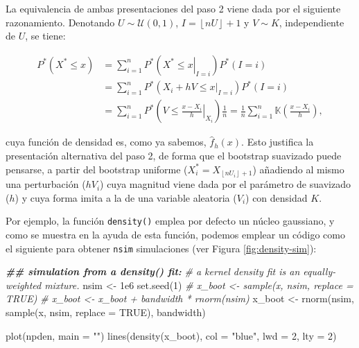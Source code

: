 \documentclass[
]{book}
\newenvironment{Shaded}{\begin{snugshade}}{\end{snugshade}}
\newcommand{\AttributeTok}[1]{\textcolor[rgb]{0.77,0.63,0.00}{#1}}
\newcommand{\CommentTok}[1]{\textcolor[rgb]{0.56,0.35,0.01}{\textit{#1}}}
\newcommand{\ConstantTok}[1]{\textcolor[rgb]{0.00,0.00,0.00}{#1}}
\newcommand{\DecValTok}[1]{\textcolor[rgb]{0.00,0.00,0.81}{#1}}
\newcommand{\DocumentationTok}[1]{\textcolor[rgb]{0.56,0.35,0.01}{\textbf{\textit{#1}}}}
\newcommand{\FloatTok}[1]{\textcolor[rgb]{0.00,0.00,0.81}{#1}}
\newcommand{\FunctionTok}[1]{\textcolor[rgb]{0.00,0.00,0.00}{#1}}
\newcommand{\NormalTok}[1]{#1}
\newcommand{\OtherTok}[1]{\textcolor[rgb]{0.56,0.35,0.01}{#1}}
\newcommand{\StringTok}[1]{\textcolor[rgb]{0.31,0.60,0.02}{#1}}
\theoremstyle{break}
\theoremstyle{definition}
\theoremstyle{definition}
\theoremstyle{definition}
\theoremstyle{definition}
\theoremstyle{remark}
\begin{document}
La equivalencia de ambas presentaciones del paso 2 viene dada por el
siguiente razonamiento. Denotando \(U\sim \mathcal{U}\left( 0,1 \right)\),
\(I=\left\lfloor nU\right\rfloor +1\) y \(V\sim K\), independiente de \(U\), se
tiene:

\[\begin{aligned}
P^{\ast}\left( X^{\ast}\leq x \right) &= \sum_{i=1}^{n}P^{\ast}\left(
\left. X^{\ast}\leq x\right\vert _{I=i} \right) P^{\ast}\left( I=i \right) \\
&= \sum_{i=1}^{n}P^{\ast}\left( \left. X_i+hV\leq x\right\vert
_{I=i} \right) P^{\ast}\left( I=i \right) \\
&= \sum_{i=1}^{n}P^{\ast}\left( \left. V\leq \frac{x-X_i}{h}
\right\vert _{X_i} \right) \frac{1}{n}=\frac{1}{n}\sum_{i=1}^{n}\mathbb{K}
\left( \frac{x-X_i}{h} \right),
\end{aligned}\]

cuya función de densidad es, como ya sabemos, \(\hat{f}_{h}\left( x \right)\). Esto justifica la presentación alternativa del paso 2, de
forma que el bootstrap suavizado puede pensarse, a partir del bootstrap
uniforme (\(X_i^{\ast}=X_{\left\lfloor nU_i\right\rfloor +1}\))
añadiendo al mismo una perturbación (\(hV_i\)) cuya magnitud viene dada
por el parámetro de suavizado (\(h\)) y cuya forma imita a la de una
variable aleatoria (\(V_i\)) con densidad \(K\).

Por ejemplo, la función \texttt{density()} emplea por defecto un núcleo
gaussiano, y como se muestra en la ayuda de esta función,
podemos emplear un código como el siguiente para obtener
\texttt{nsim} simulaciones (ver Figura \ref{fig:density-sim}):

\begin{Shaded}
\begin{Highlighting}[]
\DocumentationTok{\#\# simulation from a density() fit:}
\CommentTok{\# a kernel density fit is an equally{-}weighted mixture.}
\NormalTok{nsim }\OtherTok{\textless{}{-}} \FloatTok{1e6}
\FunctionTok{set.seed}\NormalTok{(}\DecValTok{1}\NormalTok{)}
\CommentTok{\# x\_boot \textless{}{-} sample(x, nsim, replace = TRUE)}
\CommentTok{\# x\_boot \textless{}{-} x\_boot + bandwidth * rnorm(nsim)}
\NormalTok{x\_boot }\OtherTok{\textless{}{-}} \FunctionTok{rnorm}\NormalTok{(nsim, }\FunctionTok{sample}\NormalTok{(x, nsim, }\AttributeTok{replace =} \ConstantTok{TRUE}\NormalTok{), bandwidth)}

\FunctionTok{plot}\NormalTok{(npden, }\AttributeTok{main =} \StringTok{""}\NormalTok{)}
\FunctionTok{lines}\NormalTok{(}\FunctionTok{density}\NormalTok{(x\_boot), }\AttributeTok{col =} \StringTok{"blue"}\NormalTok{, }\AttributeTok{lwd =} \DecValTok{2}\NormalTok{, }\AttributeTok{lty =} \DecValTok{2}\NormalTok{)}
\end{Highlighting}
\end{Shaded}
\end{document}
